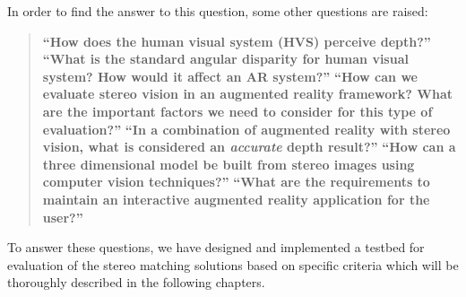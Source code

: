 In order to find the answer to this question, some other questions are raised:
\begin{quote}
\textbf {``How does the human visual system (HVS) perceive depth?''}\newline
\textbf {``What is the standard angular disparity for human visual system? How would it affect an AR system?''} \newline
\textbf {``How can we evaluate stereo vision in an augmented reality framework? What are the important factors we need to consider for 
	this type of evaluation?''} \newline
\textbf {``In a combination of augmented reality with stereo vision, what is considered an \textbf{\textit {accurate}} depth result?''} \newline
\textbf {``How can a three dimensional model be built from stereo images using computer vision techniques?''}\newline
\textbf {``What are the requirements to maintain an interactive augmented reality application for the user?''} \newline
\end{quote}

To answer these questions, we have designed and implemented a testbed for evaluation of
the stereo matching solutions based on specific criteria which will be thoroughly described in the following chapters.

